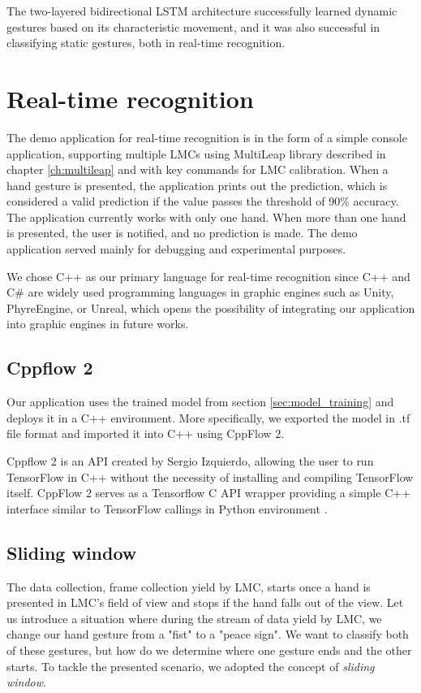 The two-layered bidirectional LSTM architecture successfully learned dynamic gestures based on its characteristic movement, and it was also successful in classifying static gestures, both in real-time recognition.

\section{Real-time recognition}
\label{real_time_recognition}

The demo application for real-time recognition is in the form of a simple console application, supporting multiple LMCs using MultiLeap \cite{tomasMultileap} library described in chapter \ref{ch:multileap} and with key commands for LMC calibration. When a hand gesture is presented, the application prints out the prediction, which is considered a valid prediction if the value passes the threshold of 90\% accuracy. The application currently works with only one hand. When more than one hand is presented, the user is notified, and no prediction is made. The demo application served mainly for debugging and experimental purposes. 

We chose C++ as our primary language for real-time recognition since C++ and C\# are widely used programming languages in graphic engines such as Unity, PhyreEngine, or Unreal, which opens the possibility of integrating our application into graphic engines in future works.

\subsection{Cppflow 2}

Our application uses the trained model from section \ref{sec:model_training} and deploys it in a C++ environment. More specifically, we exported the model in .tf file format and imported it into C++ using CppFlow 2.

Cppflow 2 is an API created by Sergio Izquierdo, allowing the user to run TensorFlow in C++ without the necessity of installing and compiling TensorFlow itself. CppFlow 2 serves as a Tensorflow C API wrapper providing a simple C++ interface similar to TensorFlow callings in Python environment \cite{cppflow}. 

\subsection{Sliding window}

The data collection, frame collection yield by LMC, starts once a hand is presented in LMC's field of view and stops if the hand falls out of the view. Let us introduce a situation where during the stream of data yield by LMC, we change our hand gesture from a "fist" to a "peace sign". We want to classify both of these gestures, but how do we determine where one gesture ends and the other starts. To tackle the presented scenario, we adopted the concept of \textit{sliding window}.

